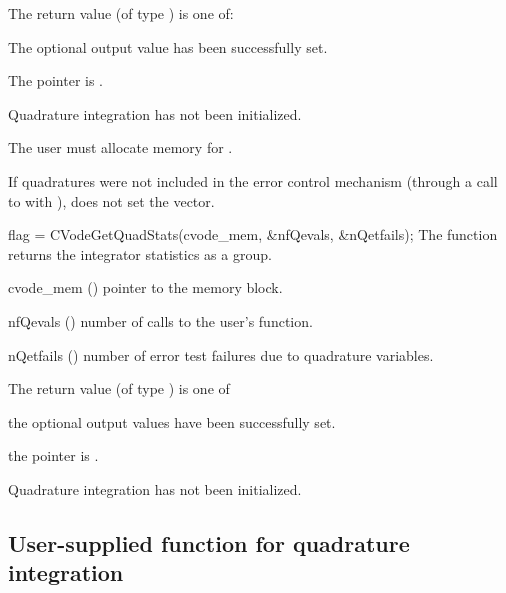 {
  The return value  (of type ) is one of:
  \begin{args}
  \item[\Id{CV\_SUCCESS}] 
    The optional output value has been successfully set.
  \item[\Id{CV\_MEM\_NULL}]
    The  pointer is .
  \item[\Id{CV\_NO\_QUAD}]
    Quadrature integration has not been initialized.
  \end{args}
}
{
  {\warn} The user must allocate memory for .

  If quadratures were not included in the error control mechanism (through a 
  call to  with ), 
   does not set the  vector.
}
{
  flag = CVodeGetQuadStats(cvode\_mem, \&nfQevals, \&nQetfails);
}
{
  The function  returns the {\cvodes} integrator statistics
  as a group.
}
{
  \begin{args}
  \item[cvode\_mem] ()
    pointer to the {\cvodes} memory block.
  \item[nfQevals] ()
    number of calls to the user's  function.
  \item[nQetfails] ()
    number of error test failures due to quadrature variables.
  \end{args}
}
{
  The return value  (of type ) is one of
  \begin{args}
  \item[\Id{CV\_SUCCESS}] 
    the optional output values have been successfully set.
  \item[\Id{CV\_MEM\_NULL}]
    the  pointer is .
  \item[\Id{CV\_NO\_QUAD}]
    Quadrature integration has not been initialized.
  \end{args}
}
{}


\subsection{User-supplied function for quadrature integration}
\label{ss:user_fct_quad}

